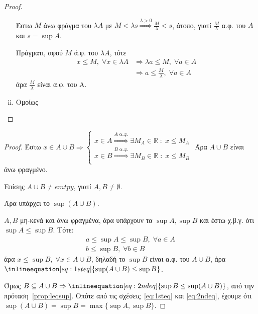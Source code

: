 \documentclass[main.tex]{subfiles}
\begin{document}
\begin{proof}
\begin{enumerate}[i)]
\begin{myitemize}
          Έστω $M$ άνω φράγμα του $ \lambda A $ με $ M < \lambda s 
          \overset{\lambda >0} {\Rightarrow} \frac{M}{\lambda} < s  $, 
          άτοπο, γιατί $ \frac{ M}{\lambda} $ α.φ. του $A$ και $ s= \sup A $.

          Πράγματι, αφού $ M $ ά.φ. του $ \lambda A $, τότε
          \begin{align*}
            x \leq M, \; \forall x \in \lambda A 
            &\Rightarrow \lambda a \leq M, \; \forall a \in A \\
            &\Rightarrow a \leq \frac{M}{\lambda}, \; \forall a \in A
          \end{align*} 
          άρα $ \frac{M}{\lambda} $ είναι α.φ. του Α.
      \end{myitemize}

    \item Ομοίως
  \end{enumerate}
\end{proof}


\begin{proof}
  Έστω $ x \in A \cup B \Rightarrow \begin{cases} x \in A \overset{A \; \text{α.φ.}}{
    \Rightarrow} \exists M_{A} \in \mathbb{R} \; : \; x \leq M_{A} \\
    x \in B \overset{B \; \text{α.φ.}}{ \Rightarrow} \exists M_{B} \in \mathbb{R} 
    \; : \; x \leq M_{B}  \\
  \end{cases} $  
  Άρα $ A \cup B $ είναι άνω φραγμένο.

  Επίσης $ A \cup B \neq emtpy $, γιατί $ A, B \neq \emptyset $. 

  Άρα υπάρχει το $ \sup (A \cup B) $.

  $ A,B $ μη-κενά και άνω φραγμένα, άρα υπάρχουν τα $ \sup A, \sup B $ 
  και έστω χ.β.γ.  ότι $ \sup A \leq \sup B $. Τότε:
  \begin{gather*}
    a \leq \sup A \leq \sup B, \; \forall a \in A \\
    b \leq \sup B, \; \forall b \in B 
  \end{gather*}
  άρα $ x \leq \sup B, \; \forall x \in A \cup B  $, δηλαδή το $ \sup B $ 
  είναι α.φ. του $ A \cup B $, άρα $ \inlineequation[eq:1steq]{\sup (A \cup B) 
  \leq \sup B} $.

  Όμως $ B \subseteq A \cup B \Rightarrow \inlineequation[eq:2ndeq]{\sup B \leq 
  \sup (A \cup B)} $, από την πρόταση~\ref{prop:leqsup}. 
  Οπότε από τις σχέσεις~\eqref{eq:1steq} και \eqref{eq:2ndeq}, έχουμε ότι $
  \sup (A \cup B) = \sup B = \max \{ \sup A, \sup B \} $.
\end{proof}
\end{document}
